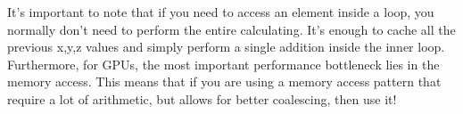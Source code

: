 \documentclass[a4paper,10pt]{article}
\begin{document}
It's important to note that if you need to access an element inside a loop, you normally don't need to perform the entire calculating. It's enough to cache all the previous x,y,z values and simply perform a single addition inside the inner loop. Furthermore, for GPUs, the most important performance bottleneck lies in the memory access. This means that if you are using a memory access pattern that require a lot of arithmetic, but allows for better coalescing, then use it!

\appendix
\end{document}
